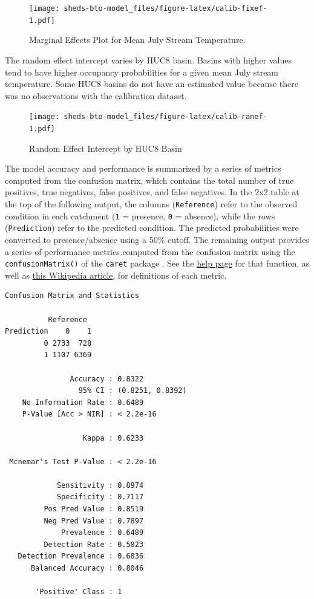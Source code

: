 \documentclass[
]{book}
\begin{document}
\begin{figure}
\centering
\texttt{[image: sheds-bto-model\_files/figure-latex/calib-fixef-1.pdf]}
\caption{\label{fig:calib-fixef}Marginal Effects Plot for Mean July Stream Temperature.}
\end{figure}

The random effect intercept varies by HUC8 basin. Basins with higher values tend to have higher occupancy probabilities for a given mean July stream temperature. Some HUC8 basins do not have an estimated value because there was no observations with the calibration dataset.

\begin{figure}
\centering
\texttt{[image: sheds-bto-model\_files/figure-latex/calib-ranef-1.pdf]}
\caption{\label{fig:calib-ranef}Random Effect Intercept by HUC8 Basin}
\end{figure}

The model accuracy and performance is summarized by a series of metrics computed from the confusion matrix, which contains the total number of true positives, true negatives, false positives, and false negatives. In the 2x2 table at the top of the following output, the columns (\texttt{Reference}) refer to the observed condition in each catchment (\texttt{1} = presence, \texttt{0} = absence), while the rows (\texttt{Prediction}) refer to the predicted condition. The predicted probabilities were converted to presence/absence using a 50\% cutoff. The remaining output provides a series of performance metrics computed from the confusion matrix using the \texttt{confusionMatrix()} of the \texttt{caret} package \citep{kuhn2022}. See the \href{https://rdrr.io/cran/caret/man/confusionMatrix.html}{help page} for that function, as well as \href{https://en.wikipedia.org/wiki/Confusion_matrix}{this Wikipedia article}, for definitions of each metric.

\begin{verbatim}
Confusion Matrix and Statistics

          Reference
Prediction    0    1
         0 2733  728
         1 1107 6369
                                          
               Accuracy : 0.8322          
                 95% CI : (0.8251, 0.8392)
    No Information Rate : 0.6489          
    P-Value [Acc > NIR] : < 2.2e-16       
                                          
                  Kappa : 0.6233          
                                          
 Mcnemar's Test P-Value : < 2.2e-16       
                                          
            Sensitivity : 0.8974          
            Specificity : 0.7117          
         Pos Pred Value : 0.8519          
         Neg Pred Value : 0.7897          
             Prevalence : 0.6489          
         Detection Rate : 0.5823          
   Detection Prevalence : 0.6836          
      Balanced Accuracy : 0.8046          
                                          
       'Positive' Class : 1               
                                          
\end{verbatim}
\end{document}
